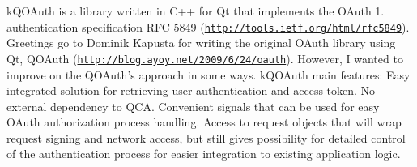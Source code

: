 k\+Q\+O\+Auth is a library written in C++ for Qt that implements the O\+Auth 1. authentication specification R\+FC 5849 (\href{http://tools.ietf.org/html/rfc5849}{\tt http\+://tools.\+ietf.\+org/html/rfc5849}). Greetings go to Dominik Kapusta for writing the original O\+Auth library using Qt, Q\+O\+Auth (\href{http://blog.ayoy.net/2009/6/24/oauth}{\tt http\+://blog.\+ayoy.\+net/2009/6/24/oauth}). However, I wanted to improve on the Q\+O\+Auth’s approach in some ways. k\+Q\+O\+Auth main features\+: Easy integrated solution for retrieving user authentication and access token. No external dependency to Q\+CA. Convenient signals that can be used for easy O\+Auth authorization process handling. Access to request objects that will wrap request signing and network access, but still gives possibility for detailed control of the authentication process for easier integration to existing application logic. 